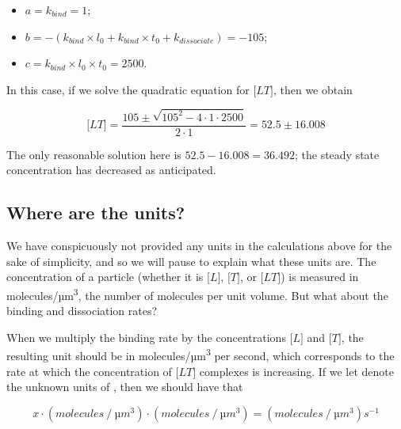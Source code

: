 \begin{itemize}
 \item $a = k_{bind} = 1$;
 \item $b = - (k_{bind} \times l_0 + k_{bind} \times t_0 + k_{dissociate}) = -105$;
 \item $c = k_{bind} \times l_0 \times t_0 = 2500$.
\end{itemize}

In this case, if we solve the quadratic equation for $\text{[}LT\text{]}$, then we obtain

$$\text{[}LT\text{]} = \frac{105 \pm \sqrt{105^2 - 4 \cdot 1 \cdot 2500}}{2 \cdot 1} = 52.5 \pm 16.008$$

The only reasonable solution here is $52.5-16.008 = 36.492$; the steady state concentration has decreased as anticipated.\\

\begin{qbox}\end{qbox}

\FloatBarrier
{}
\subsection{Where are the units?}

We have conspicuously not provided any units in the calculations above for the sake of simplicity, and so we will pause to explain what these units are. The concentration of a particle (whether it is $\text{[}L\text{]}$, $\text{[}T\text{]}$, or $\text{[}LT\text{]}$) is measured in molecules/µm\textsuperscript{3}, the number of molecules per unit volume. But what about the binding and dissociation rates?

When we multiply the binding rate  by the concentrations $\text{[}L\text{]}$ and $\text{[}T\text{]}$, the resulting unit should be in molecules/µm\textsuperscript{3} per second, which corresponds to the rate at which the concentration of $\text{[}LT\text{]}$ complexes is increasing. If we let  denote the unknown units of , then we should have that

$$x \cdot (molecules\mathbin{/}µm^3) \cdot (molecules\mathbin{/}µm^3) = (molecules\mathbin{/}µm^3)s^{-1}$$

